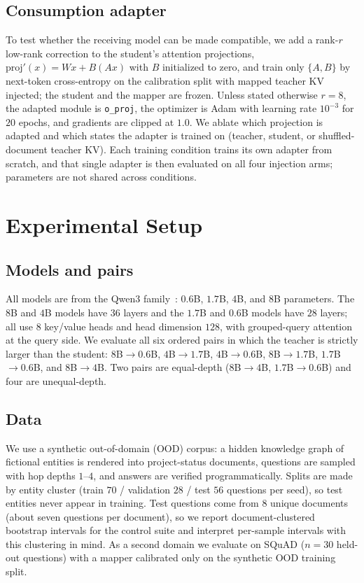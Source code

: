 \documentclass[11pt]{article}
\begin{document}
\subsection{Consumption adapter}
\label{sec:adapter}
To test whether the receiving model can be made compatible, we add a rank-$r$
low-rank correction to the student's attention projections,
$\mathrm{proj}'(x)=Wx+B(Ax)$ with $B$ initialized to zero, and train only
$\{A,B\}$ by next-token cross-entropy on the calibration split with mapped
teacher KV injected; the student and the mapper are frozen. Unless stated
otherwise $r=8$, the adapted module is \texttt{o\_proj}, the optimizer is Adam
with learning rate $10^{-3}$ for $20$ epochs, and gradients are clipped at $1.0$.
We ablate which projection is adapted and which states the adapter is trained on
(teacher, student, or shuffled-document teacher KV). Each training condition
trains its own adapter from scratch, and that single adapter is then evaluated on
all four injection arms; parameters are not shared across conditions.
\section{Experimental Setup}

\subsection{Models and pairs}
\label{sec:models}
All models are from the Qwen3 family~\cite{qwen3report2025}: $0.6$B, $1.7$B, $4$B, and $8$B
parameters. The $8$B and $4$B models have $36$ layers and the $1.7$B and $0.6$B
models have $28$ layers; all use $8$ key/value heads and head dimension $128$,
with grouped-query attention at the query side. We evaluate all six ordered pairs
in which the teacher is strictly larger than the student: $8$B$\to0.6$B,
$4$B$\to1.7$B, $4$B$\to0.6$B, $8$B$\to1.7$B, $1.7$B$\to0.6$B, and
$8$B$\to4$B. Two pairs are equal-depth ($8$B$\to4$B, $1.7$B$\to0.6$B) and four
are unequal-depth.

\subsection{Data}
\label{sec:data}
We use a synthetic out-of-domain (OOD) corpus: a hidden knowledge graph of
fictional entities is rendered into project-status documents, questions are
sampled with hop depths $1$--$4$, and answers are verified programmatically.
Splits are made by entity cluster (train $70$ / validation $28$ / test $56$
questions per seed), so test entities never appear in training. Test questions
come from $8$ unique documents (about seven questions per document), so we report
document-clustered bootstrap intervals for the control suite and interpret
per-sample intervals with this clustering in mind. As a second domain we evaluate
on SQuAD ($n=30$ held-out questions) with a mapper calibrated only on the
synthetic OOD training split.
\end{document}
